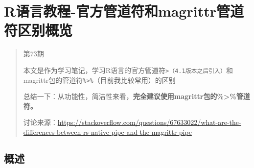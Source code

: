 \documentclass[
]{article}
\author{}
\date{\vspace{-2.5em}}
\begin{document}
{
\setcounter{tocdepth}{2}
\tableofcontents
}
\section{R语言教程-官方管道符和magrittr管道符区别概览}\label{rux8bedux8a00ux6559ux7a0b-ux5b98ux65b9ux7ba1ux9053ux7b26ux548cmagrittrux7ba1ux9053ux7b26ux533aux522bux6982ux89c8}

\begin{quote}
第73期

本文是作为学习笔记，学习R语言的官方管道符\texttt{\textbar{}\textgreater{}（4.1版本之后引入）}和magrittr包的管道符\texttt{\%\textgreater{}\%}（目前我比较常用）的区别

总结一下：从功能性，简洁性来看，\textbf{完全建议使用magrittr包的\%\textgreater\%管道符。}

讨论来源：\url{https://stackoverflow.com/questions/67633022/what-are-the-differences-between-rs-native-pipe-and-the-magrittr-pipe}
\end{quote}

\subsection{概述}\label{ux6982ux8ff0}
\end{document}
